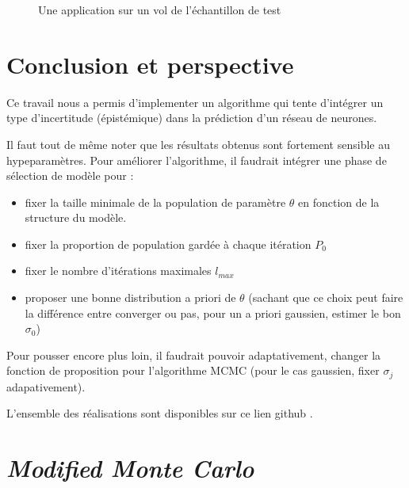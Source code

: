 \documentclass[french,12pt]{article}
\let\oldsection\section%
\renewcommand{\section}{%
  \renewcommand{\theequation}{\thesection.\arabic{equation}}%
  \oldsection}%
\begin{document}
\begin{figure}[H]
    \centering
    \caption{Une application sur un vol de l'échantillon de test}
\end{figure}







\pagebreak
\section{Conclusion et perspective}
Ce travail nous a permis d'implementer un algorithme qui tente d'intégrer
un type d'incertitude (épistémique) dans la prédiction d'un réseau de
neurones.

Il faut tout de même noter que les résultats obtenus sont fortement
sensible au hypeparamètres. Pour améliorer l'algorithme, il faudrait
intégrer une phase de sélection de modèle pour :

\begin{itemize}
    \item fixer la taille minimale de la population de paramètre $\theta$ en fonction
          de la structure du modèle.
    \item fixer la proportion de population gardée à chaque itération $P_0$
    \item fixer le nombre d'itérations maximales $l_{max}$
    \item proposer une bonne distribution a priori de $\theta$ \cite{Andrieu2003} (sachant que ce choix
          peut faire la différence entre converger ou pas, pour un a priori gaussien, estimer
          le bon $\sigma_0$)
\end{itemize}

Pour pousser encore plus loin, il faudrait pouvoir adaptativement, changer la fonction
de proposition pour l'algorithme MCMC \cite{Andrieu2003,Chiachio2014}(pour le cas gaussien, fixer $\sigma_j$ adapativement).

L'ensemble des réalisations sont disponibles sur ce lien github \cite{githubLink}.



\pagebreak



\pagebreak
\appendix

\section*{\textit{Modified Monte Carlo}}
\end{document}
